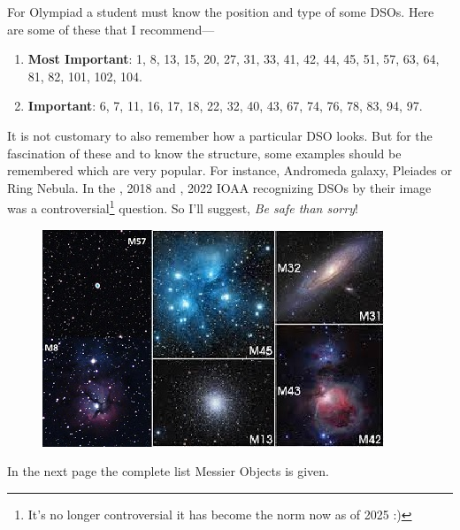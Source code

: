 \documentclass[a4paper,12pt]{extarticle}
\begin{document}
For Olympiad a student must know the position and type of some DSOs. Here are some of these that I recommend---

\begin{enumerate}
	\item \textbf{Most Important}: {\color{red} 1, 8, 13, 15, 20, 27, 31, 33, 41, 42, 44, 45, 51, 57, 63, 64, 81, 82, 101, 102, 104.}
	\item \textbf{Important}: 6, 7, 11, 16, 17, 18, 22, 32, 40, 43, 67, 74, 76, 78, 83, 94, 97.
\end{enumerate}

It is not customary to also remember how a particular DSO looks. But for the fascination of these and to know the structure, some examples should be remembered which are very popular. For instance, Andromeda galaxy, Pleiades or Ring Nebula. In the , 2018 and , 2022 IOAA recognizing DSOs by their image was a controversial\footnote{It's no longer controversial it has become the norm now as of 2025 :) } question. So I'll suggest, \textit{Be safe than sorry}!  

\begin{figure}[H]
    \centering
    \includegraphics[width=0.8\linewidth]{m_o.jpg}
\end{figure}

In the next page the complete list Messier Objects is given. 
\end{document}
